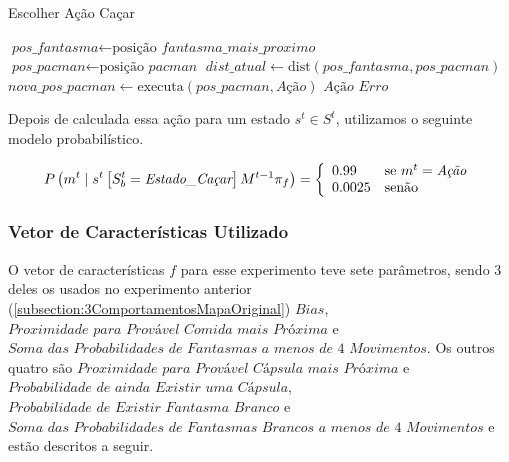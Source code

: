 \begin{algorithm}[H]
	\caption{Escolher Ação Caçar} \label{algorithm:SelecaoDeAcaoFugir}
	\begin{algorithmic}[1]
			\State $\textit{pos\_fantasma} \gets \text{posição }\textit{fantasma\_mais\_proximo} $
			\State $\textit{pos\_pacman} \gets \text{posição }\textit{pacman} $
			\State $\textit{dist\_atual} \gets \text{dist} \left( \textit{pos\_fantasma}, \textit{pos\_pacman} \right) $
				\State $\textit{nova\_pos\_pacman} \gets \text{executa} \left( \textit{pos\_pacman}, \textit{Ação} \right) $
					\State \Return $ \textit{Ação} $
				\EndIf 
			\EndFor
			\State \Return $ \textit{Erro} $
		\EndProcedure
	\end{algorithmic}
\end{algorithm}

Depois de calculada essa ação para um estado $ s^t \in S^t $, utilizamos o seguinte modelo probabilístico.

\begin{equation}
    P \left( m^t \mid s^t \left[ S_b^t = \textit{Estado\_Caçar} \right] M^{t-1} \pi_f \right) = 
        \left\{
            \begin{array}{l l}
                0.99 & \text{se }m^t = \textit{Ação} \\
                0.0025 & \text{senão}
            \end{array}
        \right.
\end{equation}

\subsubsection{Vetor de Características Utilizado} \label{subsubsection:5ComportamentosVetorCaracterísticas}

O vetor de características $ f $ para esse experimento teve sete parâmetros, sendo 3 deles os usados no experimento anterior (\ref{subsection:3ComportamentosMapaOriginal}) $ Bias $, $ \textit{Proximidade para Provável Comida mais Próxima} $ e $ \textit{Soma das Probabilidades de Fantasmas a menos de 4 Movimentos} $. Os outros quatro são $ \textit{Proximidade para Provável Cápsula mais Próxima} $ e $ \textit{Probabilidade de ainda Existir uma Cápsula} $, $ \textit{Probabilidade de Existir Fantasma Branco} $ e $ \textit{Soma das Probabilidades de Fantasmas Brancos a menos de 4 Movimentos} $ e estão descritos a seguir.

